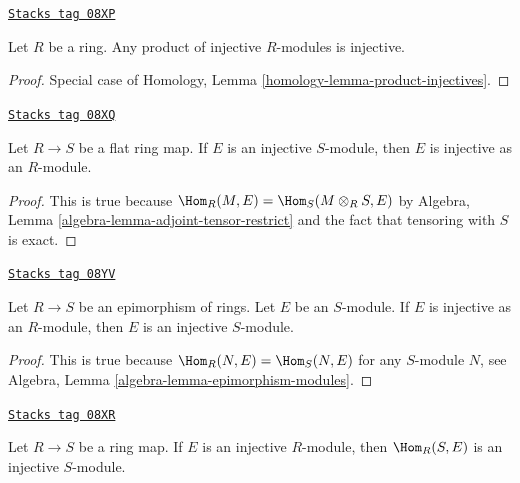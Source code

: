 \begin{lemma}
\label{dualizing-lemma-product-injectives}
\href{https://stacks.math.columbia.edu/tag/08XP}{\texttt{Stacks tag 08XP}}

Let $R$ be a ring. Any product of injective $R$-modules is injective.
\end{lemma}

\begin{proof}
Special case of Homology, Lemma \ref{homology-lemma-product-injectives}.
\end{proof}

\begin{lemma}
\label{dualizing-lemma-injective-flat}
\href{https://stacks.math.columbia.edu/tag/08XQ}{\texttt{Stacks tag 08XQ}}

Let $R \to S$ be a flat ring map. If $E$ is an injective $S$-module,
then $E$ is injective as an $R$-module.
\end{lemma}

\begin{proof}
This is true because $\Hom_R(M, E) = \Hom_S(M \otimes_R S, E)$
by Algebra, Lemma \ref{algebra-lemma-adjoint-tensor-restrict}
and the fact that tensoring with $S$ is exact.
\end{proof}

\begin{lemma}
\label{dualizing-lemma-injective-epimorphism}
\href{https://stacks.math.columbia.edu/tag/08YV}{\texttt{Stacks tag 08YV}}

Let $R \to S$ be an epimorphism of rings. Let $E$ be an $S$-module.
If $E$ is injective as an $R$-module, then $E$ is an injective $S$-module.
\end{lemma}

\begin{proof}
This is true because $\Hom_R(N, E) = \Hom_S(N, E)$ for any $S$-module $N$,
see Algebra, Lemma \ref{algebra-lemma-epimorphism-modules}.
\end{proof}

\begin{lemma}
\label{dualizing-lemma-hom-injective}
\href{https://stacks.math.columbia.edu/tag/08XR}{\texttt{Stacks tag 08XR}}

Let $R \to S$ be a ring map. If $E$ is an injective $R$-module,
then $\Hom_R(S, E)$ is an injective $S$-module.
\end{lemma}

